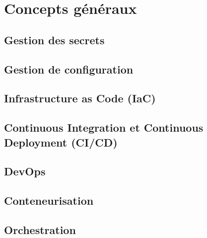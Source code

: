 \section{Concepts généraux}

\subsection{Gestion des secrets}


\subsection{Gestion de configuration}


\subsection{Infrastructure as Code (IaC)}


\subsection{Continuous Integration et Continuous Deployment (CI/CD)}


\subsection{DevOps}


\subsection{Conteneurisation}


\subsection{Orchestration}



